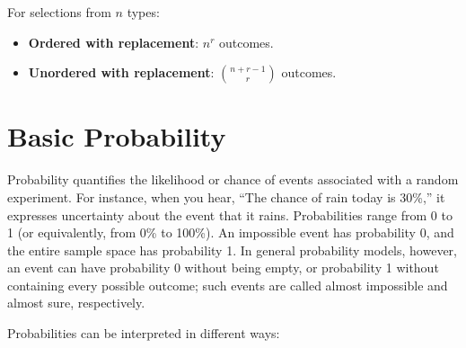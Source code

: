\begin{proposition}
For selections from $n$ types:
\begin{itemize}
    \item \textbf{Ordered with replacement}: $n^r$ outcomes.
    \item \textbf{Unordered with replacement}: $\displaystyle \binom{n+r-1}{r}$ outcomes. %
\end{itemize}
\end{proposition}

\section{Basic Probability}
Probability quantifies the likelihood or chance of events associated with a random experiment. For instance, when you hear, “The chance of rain today is 30\%,” it expresses uncertainty about the event that it rains. Probabilities range from 0 to 1 (or equivalently, from 0\% to 100\%). An impossible event has probability 0, and the entire sample space has probability 1. In general probability models, however, an event can have probability 0 without being empty, or probability 1 without containing every possible outcome; such events are called almost impossible and almost sure, respectively.

Probabilities can be interpreted in different ways:

